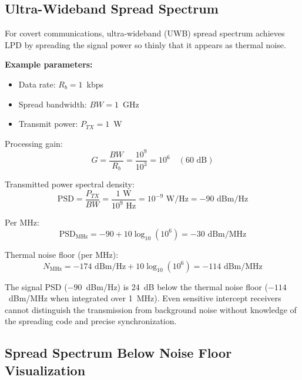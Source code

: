 \subsection{Ultra-Wideband Spread Spectrum}

For covert communications, ultra-wideband (UWB) spread spectrum achieves LPD by spreading the signal power so thinly that it appears as thermal noise.

\textbf{Example parameters:}
\begin{itemize}
\item Data rate: $R_b = 1$~kbps
\item Spread bandwidth: $BW = 1$~GHz
\item Transmit power: $P_{TX} = 1$~W
\end{itemize}

Processing gain:
\begin{equation}
G = \frac{BW}{R_b} = \frac{10^9}{10^3} = 10^6 \quad (60 \text{ dB})
\end{equation}

Transmitted power spectral density:
\begin{equation}
\text{PSD} = \frac{P_{TX}}{BW} = \frac{1 \text{ W}}{10^9 \text{ Hz}} = 10^{-9} \text{ W/Hz} = -90 \text{ dBm/Hz}
\end{equation}

Per MHz:
\begin{equation}
\text{PSD}_{\text{MHz}} = -90 + 10 \log_{10}(10^6) = -30 \text{ dBm/MHz}
\end{equation}

Thermal noise floor (per MHz):
\begin{equation}
N_{\text{MHz}} = -174 \text{ dBm/Hz} + 10 \log_{10}(10^6) = -114 \text{ dBm/MHz}
\end{equation}

\begin{keyconcept}
The signal PSD ($-90$~dBm/Hz) is 24~dB below the thermal noise floor ($-114$~dBm/MHz when integrated over 1~MHz). Even sensitive intercept receivers cannot distinguish the transmission from background noise without knowledge of the spreading code and precise synchronization.
\end{keyconcept}

\subsection{Spread Spectrum Below Noise Floor Visualization}

